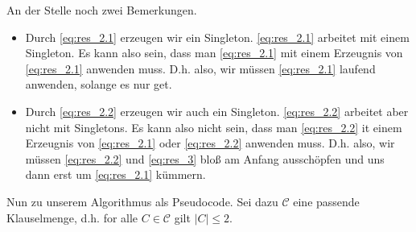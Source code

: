 \begin{solution}
\begin{enumerate}[label = (\arabic*), start = 0]
\end{enumerate}

An der Stelle noch zwei Bemerkungen.

\begin{itemize}

    \item Durch \eqref{eq:res_2.1} erzeugen wir ein Singleton.
    \eqref{eq:res_2.1} arbeitet mit einem Singleton.
    Es kann also sein, dass man \eqref{eq:res_2.1} mit einem Erzeugnis von \eqref{eq:res_2.1} anwenden muss.
    D.h. also, wir müssen \eqref{eq:res_2.1} laufend anwenden, solange es nur get.

    \item Durch \eqref{eq:res_2.2} erzeugen wir auch ein Singleton.
    \eqref{eq:res_2.2} arbeitet aber nicht mit Singletons.
    Es kann also nicht sein, dass man \eqref{eq:res_2.2} it einem Erzeugnis von \eqref{eq:res_2.1} oder \eqref{eq:res_2.2} anwenden muss.
    D.h. also, wir müssen \eqref{eq:res_2.2} und \eqref{eq:res_3} bloß am Anfang ausschöpfen und uns dann erst um \eqref{eq:res_2.1} kümmern.

\end{itemize}

Nun zu unserem Algorithmus als Pseudocode.
Sei dazu $\mathcal C$ eine passende Klauselmenge, d.h. for alle $C \in \mathcal C$ gilt $|C| \leq 2$.


\end{solution}
